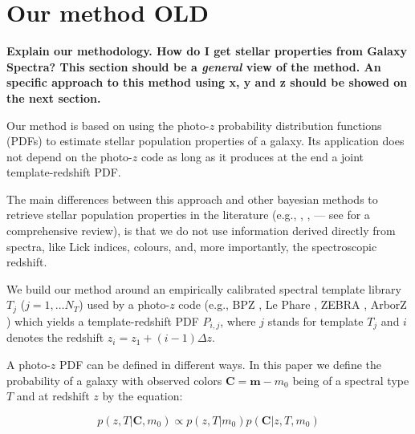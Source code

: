 \documentclass[a4paper, useAMS, usenatbib, hyperpdf]{mn2e}
\def\ojo{\fbox{\bf !$\odot$j$\odot$!}} %
\begin{document}


\section{Our method \ojo OLD}
{\bf \color{red} Explain our methodology. How do I get stellar properties from Galaxy Spectra? This section should be a {\it general} view of the method. An specific approach to this method using x, y and z should be showed on the next section.}

Our method is based on using the photo-$z$ probability distribution functions (PDFs) to estimate  stellar population properties of a galaxy. Its application does not depend on the photo-$z$ code as long as it produces at the end a joint template-redshift PDF.


The main differences between this approach and other bayesian methods to retrieve stellar population properties in the literature (e.g., \cite{Gallazzi.etal.2005a}, \cite{Bundy.2006a}, \cite{Taylor.etal.2011a} --- see \cite{Walcher.etal.2011a} for a comprehensive review), is that we do not use information derived directly from spectra, like Lick indices, colours, and, more importantly, the spectroscopic redshift. 


We build our method around an empirically calibrated spectral template library $T_{j}$ ($j=1,\ldots N_{T}$) used by a photo-$z$ code (e.g.,  BPZ \citep{Benitez.2000a}, Le Phare \citep{Arnouts.etal.1999a}, ZEBRA \cite{Feldmann.etal.2006a}, ArborZ \cite{Gerdes.etal.2010a})  which yields a template-redshift PDF $P_{i, j}$, where $j$ stands for template $T_j$ and $i$ denotes the redshift $z_i=z_1+(i-1) \Delta z$.

A photo-$z$ PDF can be defined in different ways. In this paper we define the probability of a galaxy with observed colors $\mathbf{C} = \mathbf{m} - m_0$ being of a spectral type $T$ and at redshift $z$ by the equation:

\begin{equation}
\label{eq:pzT}
p(z,T|\mathbf{C}, m_0) \propto p(z,T|m_0) p(\mathbf{C}|z,T,m_0)
\end{equation}
\end{document}
